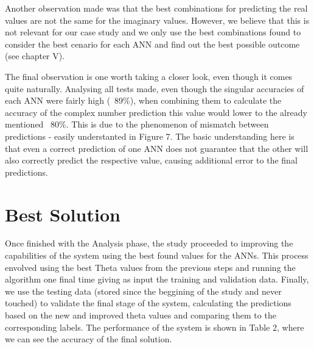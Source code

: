 \documentclass[10pt]{IEEEtran}
\begin{document}
Another observation made was that the best combinations for predicting the real values are not the same for the imaginary values. However, we believe that this is not relevant for our case study and we only use the best combinations found to consider the best cenario for each ANN and find out the best possible outcome (see chapter V).

The final observation is one worth taking a closer look, even though it comes quite naturally. Analysing all tests made, even though the singular accuracies of each ANN were fairly high (~89\%), when combining them to calculate the accuracy of the complex number prediction this value would lower to the already mentioned ~80\%. This is due to the phenomenon of mismatch between predictions - easily understanted in Figure 7. The basic understanding here is that even a correct prediction of one ANN does not guarantee that the other will also correctly predict the respective value, causing additional error to the final predictions.

\section{Best Solution} %

\begin{table}[]
\caption{Performance of the system's final version in \%}
\end{table}

Once finished with the Analysis phase, the study proceeded to improving the capabilities of the system using the best found values for the ANNs. This process envolved using the best Theta values from the previous steps and running the algorithm one final time giving as input the training and validation data. Finally, we use the testing data (stored since the beggining of the study and never touched) to validate the final stage of the system, calculating the predictions based on the new and improved theta values and comparing them to the corresponding labels.
The performance of the system is shown in Table 2, where we can see the accuracy of the final solution.
\end{document}
